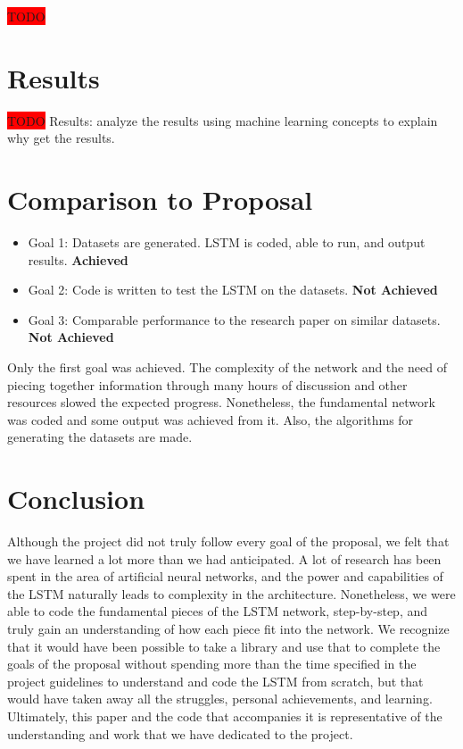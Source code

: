 \documentclass[11pt,letterpaper]{article}
\begin{document}
\colorbox{red}{TODO}

\section{Results}
\colorbox{red}{TODO}
Results: analyze the results using machine learning concepts to explain why get the results.

\section{Comparison to Proposal}
\begin{itemize}
	\item Goal 1: Datasets are generated. LSTM is coded, able to run, and output results. \textbf{Achieved}
	\item Goal 2: Code is written to test the LSTM on the datasets. \textbf{Not Achieved}
	\item Goal 3: Comparable performance to the research paper on similar datasets. \textbf{Not Achieved}
\end{itemize}

Only the first goal was achieved. The complexity of the network and the need of piecing together information through many hours of discussion and other resources slowed the expected progress. Nonetheless, the fundamental network was coded and some output was achieved from it. Also, the algorithms for generating the datasets are made. 

\section{Conclusion}
Although the project did not truly follow every goal of the proposal, we felt that we have learned a lot more than we had anticipated. A lot of research has been spent in the area of artificial neural networks, and the power and capabilities of the LSTM naturally leads to complexity in the architecture. Nonetheless, we were able to code the fundamental pieces of the LSTM network, step-by-step, and truly gain an understanding of how each piece fit into the network. We recognize that it would have been possible to take a library and use that to complete the goals of the proposal without spending more than the time specified in the project guidelines to understand and code the LSTM from scratch, but that would have taken away all the struggles, personal achievements, and learning. Ultimately, this paper and the code that accompanies it is representative of the understanding and work that we have dedicated to the project.
\end{document}

